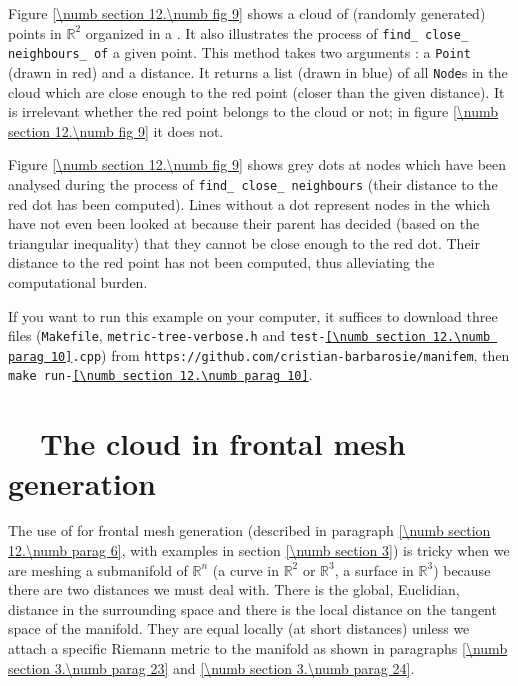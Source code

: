 Figure \ref{\numb section 12.\numb fig 9} shows a cloud of (randomly generated) points in
$ \mathbb{R}^2 $ organized in a {\small\tt{}}.
It also illustrates the process of {\small\tt find\_\,close\_\,neighbours\_\,of} a given point.
This method takes two arguments : a {\small\tt Point} (drawn in red) and a distance.
It returns a list (drawn in blue) of all {\small\tt Node}s in the cloud which are close enough
to the red point (closer than the given distance).
It is irrelevant whether the red point belongs to the cloud or not;
in figure \ref{\numb section 12.\numb fig 9} it does not.

Figure \ref{\numb section 12.\numb fig 9} shows grey dots at nodes which have been analysed
during the process of {\small\tt find\_\,close\_\,neighbours}
(their distance to the red dot has been computed).
Lines without a dot represent nodes in the {\small\tt{}} which have not even been
looked at because their parent has decided (based on the triangular inequality)
that they cannot be close enough to the red dot.
Their distance to the red point has not been computed, thus alleviating the computational
burden.

If you want to run this example on your computer, it suffices to download three files
({\small\tt Makefile}, {\small\tt metric-tree-verbose.h} and
{\small\tt test-\ref{\numb section 12.\numb parag 10}.cpp}) from\hfil\break
{\small\tt https://github.com/cristian-barbarosie/manifem},\hfil\break
then {\small\tt make run-\ref{\numb section 12.\numb parag 10}}.


\section{~~The cloud in frontal mesh generation}\label{\numb section 12.\numb parag 11}

The use of {\small\tt{}} for frontal mesh generation (described in paragraph
\ref{\numb section 12.\numb parag 6}, with examples in section \ref{\numb section 3})
is tricky when we are meshing a submanifold of $ \mathbb{R}^n $
(a curve in $ \mathbb{R}^2 $ or $ \mathbb{R}^3 $, a surface in $ \mathbb{R}^3 $)
because there are two distances we must deal with.
There is the global, Euclidian, distance in the surrounding space
and there is the local distance on the tangent space of the manifold.
They are equal locally (at short distances) unless we attach a specific Riemann metric
to the manifold as shown in paragraphs \ref{\numb section 3.\numb parag 23} and
\ref{\numb section 3.\numb parag 24}.

